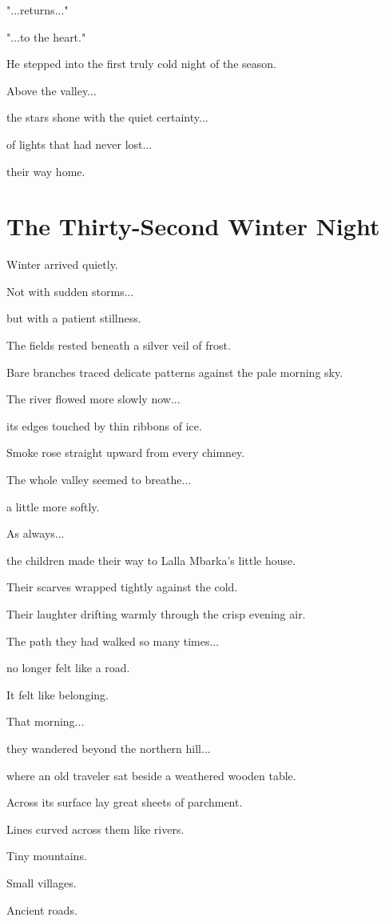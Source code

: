 \documentclass[12pt,openany]{book}
\begin{document}
"...returns..."

"...to the heart."

He stepped into the first truly cold night of the season.

Above the valley...

the stars shone with the quiet certainty...

of lights that had never lost...

their way home.
\chapter{The Thirty-Second Winter Night}

Winter arrived quietly.

Not with sudden storms...

but with a patient stillness.

The fields rested beneath a silver veil of frost.

Bare branches traced delicate patterns against the pale morning sky.

The river flowed more slowly now...

its edges touched by thin ribbons of ice.

Smoke rose straight upward from every chimney.

The whole valley seemed to breathe...

a little more softly.

As always...

the children made their way to Lalla Mbarka's little house.

Their scarves wrapped tightly against the cold.

Their laughter drifting warmly through the crisp evening air.

The path they had walked so many times...

no longer felt like a road.

It felt like belonging.

That morning...

they wandered beyond the northern hill...

where an old traveler sat beside a weathered wooden table.

Across its surface lay great sheets of parchment.

Lines curved across them like rivers.

Tiny mountains.

Small villages.

Ancient roads.
\end{document}
